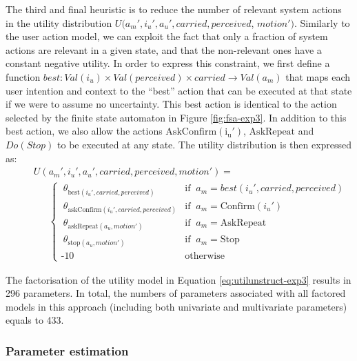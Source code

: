 The third and final heuristic is to reduce the number of relevant system actions in the utility distribution $U(a_m', i_u', a_u', \mathit{carried}, \mathit{perceived}$, $\mathit{motion'})$.  Similarly to the user action model, we can exploit the fact that only a fraction of system actions are relevant in a given state, and that the non-relevant ones have a constant negative utility. In order to express this constraint, we first define a function $best: \mathit{Val}(i_u) \times \mathit{Val}(\mathit{perceived}) \times \mathit{carried} \rightarrow \mathit{Val}(a_m)$ that maps each user intention and context to the ``best'' action that can be executed at that state if we were to assume no uncertainty. This best action is identical to the action selected by the finite state automaton in Figure \ref{fig:fsa-exp3}. In addition to this best action, we also allow the actions $\mathrm{AskConfirm(i_u')}$, $\mathrm{AskRepeat}$ and $Do(Stop)$ to be executed at any state. The utility distribution is then expressed as: 
\begin{align}
&&& U(a_m', i_u', a_u', \mathit{carried}, \mathit{perceived}, \mathit{motion'}) = \nonumber \\
&&& \ \ \ \ \ \ \  \begin{cases} \ \theta_{\text{best}(i_u', \mathit{carried}, \mathit{perceived})} & \text{if } \ a_m = best(i_u', \mathit{carried}, \mathit{perceived}) \\ 
\ \theta_{\text{askConfirm}(i_u', \mathit{carried}, \mathit{perceived})} & \text{if } \ a_m = \mathrm{Confirm}(i_u') \\
\ \theta_{\text{askRepeat}(a_u, \mathit{motion'})} & \text{if } \ a_m = \mathrm{AskRepeat} \\
\ \theta_{\text{stop}(a_u,\mathit{motion'})} & \text{if } \ a_m = \mathrm{Stop} \\ 
\mbox{-}10 & \text{otherwise}
\end{cases} \label{eq:utilunstruct-exp3}
\end{align}

The factorisation of the utility model in Equation \eqref{eq:utilunstruct-exp3} results in 296 parameters. In total, the numbers of parameters associated with all factored models in this approach (including both univariate and multivariate parameters) equals to 433.

\subsubsection*{Parameter estimation}

